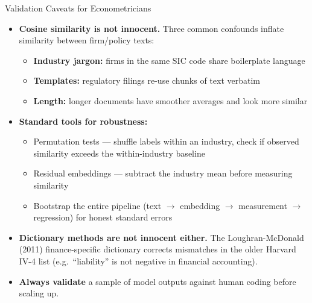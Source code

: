 \documentclass[10pt,english,aspectratio=169]{beamer}
\begin{document}
\begin{frame}{Validation Caveats for Econometricians}
\begin{itemize}
\item \textbf{Cosine similarity is not innocent.} Three common confounds inflate similarity between firm/policy texts:
\begin{itemize}
    \item \textbf{Industry jargon:} firms in the same SIC code share boilerplate language
    \item \textbf{Templates:} regulatory filings re-use chunks of text verbatim
    \item \textbf{Length:} longer documents have smoother averages and look more similar
\end{itemize}

\medskip
\item \textbf{Standard tools for robustness:}
\begin{itemize}
    \item Permutation tests --- shuffle labels within an industry, check if observed similarity exceeds the within-industry baseline
    \item Residual embeddings --- subtract the industry mean before measuring similarity
    \item Bootstrap the entire pipeline (text $\rightarrow$ embedding $\rightarrow$ measurement $\rightarrow$ regression) for honest standard errors
\end{itemize}

\medskip
\item \textbf{Dictionary methods are not innocent either.} The Loughran-McDonald (2011) finance-specific dictionary corrects mismatches in the older Harvard IV-4 list (e.g.\ ``liability'' is not negative in financial accounting).

\medskip
\item \textbf{Always validate} a sample of model outputs against human coding before scaling up.
\end{itemize}
\end{frame}
\end{document}
